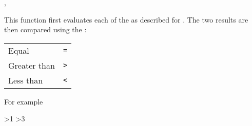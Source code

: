 \documentclass[oneside]{book}
\begin{document}
\begin{function}{\IntCompare,\IntCompareTF}
\begin{syntax}
   
     
\end{syntax}
This function first evaluates each of the 
as described for . The two results are then
compared using the :\par
{\centering\begin{tabular}{ll}
Equal        & \texttt{=} \\
Greater than & \texttt{>} \\
Less than    & \texttt{<} \\
\end{tabular}\par}
For example
\begin{demo}
>{1}{}{}
>{3}{}{}
\end{demo}
\end{function}
\end{document}
